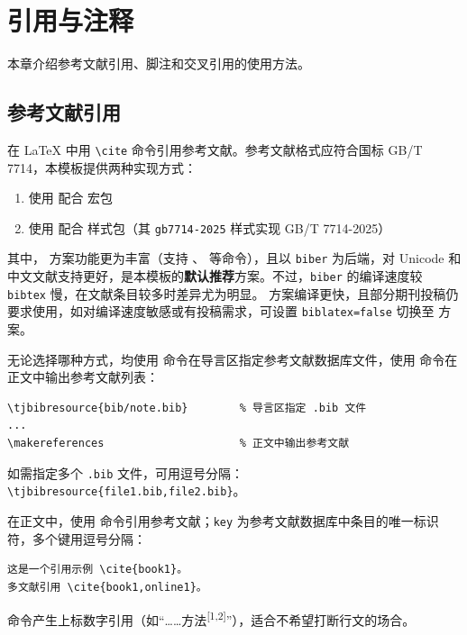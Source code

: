 \chapter{引用与注释}\label{chap:reference}

本章介绍参考文献引用、脚注和交叉引用的使用方法。

\section{参考文献引用}

在 \LaTeX{} 中用 \verb|\cite| 命令引用参考文献。参考文献格式应符合国标 GB/T 7714，本模板提供两种实现方式：
\begin{enumerate}
    \item 使用 \BibTeX{} 配合  宏包
    \item 使用 \BibLaTeX{} 配合  样式包（其 \texttt{gb7714-2025} 样式实现 GB/T 7714-2025）
\end{enumerate}
其中，\BibLaTeX{} 方案功能更为丰富（支持 、 等命令），且以 \texttt{biber} 为后端，对 Unicode 和中文文献支持更好，是本模板的\textbf{默认推荐}方案。不过，\texttt{biber} 的编译速度较 \texttt{bibtex} 慢，在文献条目较多时差异尤为明显。\BibTeX{} 方案编译更快，且部分期刊投稿仍要求使用，如对编译速度敏感或有投稿需求，可设置 \texttt{biblatex=false} 切换至 \BibTeX{} 方案。

无论选择哪种方式，均使用  命令在导言区指定参考文献数据库文件，使用  命令在正文中输出参考文献列表：

\begin{Verbatim}
\tjbibresource{bib/note.bib}        % 导言区指定 .bib 文件
...
\makereferences                     % 正文中输出参考文献
\end{Verbatim}

如需指定多个 \texttt{.bib} 文件，可用逗号分隔：\verb|\tjbibresource{file1.bib,file2.bib}|。

在正文中，使用  命令引用参考文献；\verb|key| 为参考文献数据库中条目的唯一标识符，多个键用逗号分隔：

\begin{Verbatim}
这是一个引用示例 \cite{book1}。
多文献引用 \cite{book1,online1}。
\end{Verbatim}

 命令产生上标数字引用（如“……方法\textsuperscript{[1,2]}”），适合不希望打断行文的场合。

